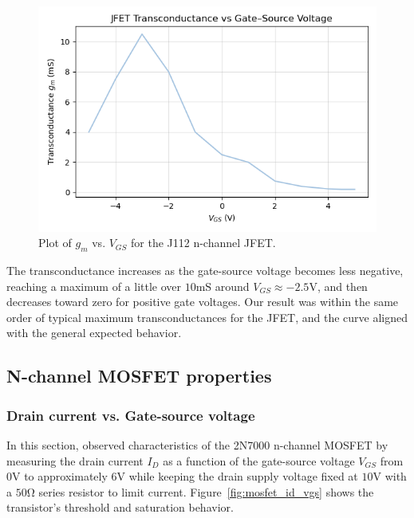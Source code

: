 \documentclass{article}
\begin{document}
\begin{figure}[H]
    \centering
    \includegraphics[width=0.8\linewidth]{6.1b.png}
    \caption{Plot of $g_m$ vs. $V_{GS}$ for the J112 n-channel JFET.}
    \label{fig:jfet_gm}
\end{figure}

\noindent The transconductance increases as the gate-source voltage becomes less
negative, reaching a maximum of a little over $10\si{\milli\siemens}$ around
$V_{GS}\approx-2.5\si{\volt}$, and then decreases toward zero for positive 
gate voltages. Our result was within the same order of typical maximum
transconductances for the JFET, and the curve aligned with the general expected behavior.


\subsection{N-channel MOSFET properties}

\subsubsection{Drain current vs. Gate-source voltage}

In this section, observed characteristics of the 2N7000 n-channel MOSFET by
measuring the drain current $I_D$ as a function of the gate-source voltage $V_{GS}$
from $0\si{\volt}$ to approximately $6\si{\volt}$ while keeping the drain 
supply voltage fixed at $10\si{\volt}$ with a $50\si{\ohm}$ series resistor
to limit current. Figure~\ref{fig:mosfet_id_vgs} shows the transistor's threshold 
and saturation behavior.
\end{document}
